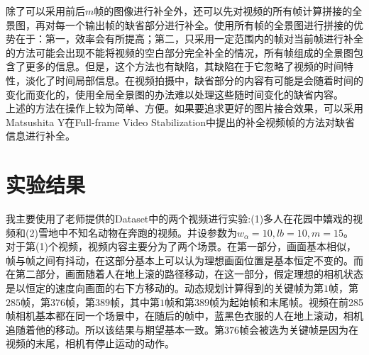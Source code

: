 \documentclass[journal, a4paper]{IEEEtran}
\begin{document}
    除了可以采用前后$m$帧的图像进行补全外，还可以先对视频的所有帧计算拼接的全景图，再对每一个输出帧的缺省部分进行补全。使用所有帧的全景图进行拼接的优势在于：第一，效率会有所提高；第二，只采用一定范围内的帧对当前帧进行补全的方法可能会出现不能将视频的空白部分完全补全的情况，所有帧组成的全景图包含了更多的信息。但是，这个方法也有缺陷，其缺陷在于它忽略了视频的时间特性，淡化了时间局部信息。在视频拍摄中，缺省部分的内容有可能是会随着时间的变化而变化的，使用全局全景图的办法难以处理这些随时间变化的缺省内容。 \\
    
    上述的方法在操作上较为简单、方便。如果要追求更好的图片接合效果，可以采用Matsushita Y在Full-frame Video Stabilization\cite{full_frame}中提出的补全视频帧的方法对缺省信息进行补全。
    
    
\section{实验结果}
    我主要使用了老师提供的Dataset中的两个视频进行实验:(1)多人在花园中嬉戏的视频和(2)雪地中不知名动物在奔跑的视频。并设参数为$w_\alpha =10,lb=10,m=15$。 \\
    
    对于第(1)个视频，视频内容主要分为了两个场景。在第一部分，画面基本相似，帧与帧之间有抖动，在这部分基本上可以认为理想画面位置是基本恒定不变的。而在第二部分，画面随着人在地上滚的路径移动，在这一部分，假定理想的相机状态是以恒定的速度向画面的右下方移动的。动态规划计算得到的关键帧为第$1$帧，第$285$帧，第$376$帧，第$389$帧，其中第$1$帧和第$389$帧为起始帧和末尾帧。视频在前285帧相机基本都在同一个场景中，在随后的帧中，蓝黑色衣服的人在地上滚动，相机追随着他的移动。所以该结果与期望基本一致。第$376$帧会被选为关键帧是因为在视频的末尾，相机有停止运动的动作。\\
    
\end{document}
